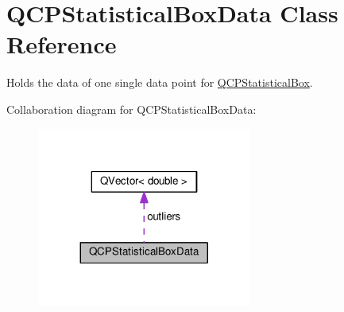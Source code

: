 \hypertarget{class_q_c_p_statistical_box_data}{}\section{Q\+C\+P\+Statistical\+Box\+Data Class Reference}
\label{class_q_c_p_statistical_box_data}


Holds the data of one single data point for \hyperlink{class_q_c_p_statistical_box}{Q\+C\+P\+Statistical\+Box}.  




Collaboration diagram for Q\+C\+P\+Statistical\+Box\+Data\+:\nopagebreak
\begin{figure}[H]
\begin{center}
\leavevmode
\includegraphics[width=200pt]{class_q_c_p_statistical_box_data__coll__graph}
\end{center}
\end{figure}

